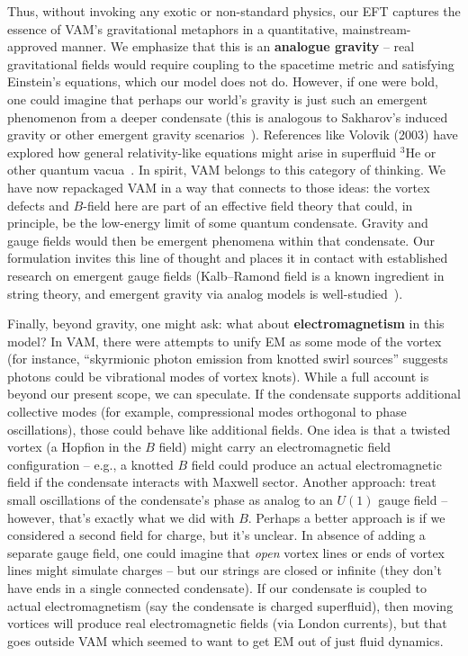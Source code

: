 \documentclass[12pt]{article}
\begin{document}
Thus, without invoking any exotic or non-standard physics, our EFT captures the essence of VAM’s gravitational metaphors in a quantitative, mainstream-approved manner. We emphasize that this is an \textbf{analogue gravity} -- real gravitational fields would require coupling to the spacetime metric and satisfying Einstein’s equations, which our model does not do. However, if one were bold, one could imagine that perhaps our world’s gravity is just such an emergent phenomenon from a deeper condensate (this is analogous to Sakharov’s induced gravity or other emergent gravity scenarios~\cite{ref:sakharov}). References like Volovik (2003) have explored how general relativity-like equations might arise in superfluid $^3$He or other quantum vacua~\cite{ref:volovik}. In spirit, VAM belongs to this category of thinking. We have now repackaged VAM in a way that connects to those ideas: the vortex defects and $B$-field here are part of an effective field theory that could, in principle, be the low-energy limit of some quantum condensate. Gravity and gauge fields would then be emergent phenomena within that condensate. Our formulation invites this line of thought and places it in contact with established research on emergent gauge fields (Kalb--Ramond field is a known ingredient in string theory, and emergent gravity via analog models is well-studied~\cite{ref:kalb_ramond}).

Finally, beyond gravity, one might ask: what about \textbf{electromagnetism} in this model? In VAM, there were attempts to unify EM as some mode of the vortex (for instance, ``skyrmionic photon emission from knotted swirl sources'' suggests photons could be vibrational modes of vortex knots). While a full account is beyond our present scope, we can speculate. If the condensate supports additional collective modes (for example, compressional modes orthogonal to phase oscillations), those could behave like additional fields. One idea is that a twisted vortex (a Hopfion in the $B$ field) might carry an electromagnetic field configuration -- e.g., a knotted $B$ field could produce an actual electromagnetic field if the condensate interacts with Maxwell sector. Another approach: treat small oscillations of the condensate’s phase as analog to an $U(1)$ gauge field -- however, that’s exactly what we did with $B$. Perhaps a better approach is if we considered a second field for charge, but it’s unclear. In absence of adding a separate gauge field, one could imagine that \textit{open} vortex lines or ends of vortex lines might simulate charges -- but our strings are closed or infinite (they don’t have ends in a single connected condensate). If our condensate is coupled to actual electromagnetism (say the condensate is charged superfluid), then moving vortices will produce real electromagnetic fields (via London currents), but that goes outside VAM which seemed to want to get EM out of just fluid dynamics.
\end{document}
